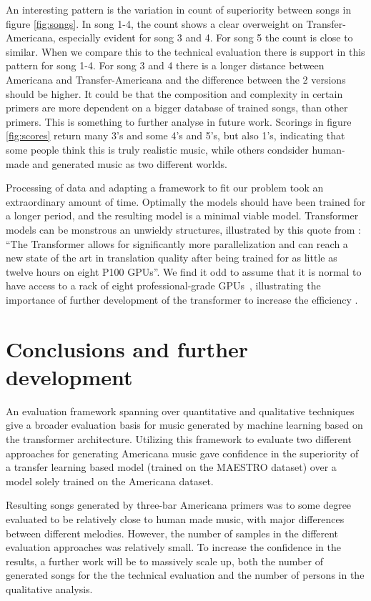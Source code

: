 \documentclass{IEEEtran}
\begin{document}
An interesting pattern is the variation in count of superiority between songs
in figure \ref{fig:songs}. In song 1-4, the count shows a clear overweight on
Transfer-Americana, especially evident for song 3 and 4. For song 5 the count
is close to similar. When we compare this to the technical evaluation there is 
support in this pattern for song 1-4. For song 3 and 4 there is a longer distance 
between Americana and Transfer-Americana and the difference between the 2 versions 
should be higher. It could be that the composition and complexity in
certain primers are more dependent on a bigger database of trained songs, than
other primers. This is something to further analyse in future work. Scorings
in figure \ref{fig:scores} return many 3's and some 4's and 5's, but also
1's, indicating that some people think this is truly realistic music, while
others condsider human-made and generated music as two different worlds.

Processing of data and adapting a framework to fit our problem 
took an extraordinary amount of time. Optimally the models should have been
trained for a longer period, and the resulting model is a minimal viable model.
Transformer models can be monstrous 
an unwieldy structures, illustrated by this quote from
\citeauthor{vaswani2017attention}: ``The Transformer allows for significantly
more parallelization and can reach a new state of the art in translation
quality after being trained for as little as twelve hours on eight P100 GPUs''.
We find it odd to assume that it is normal to have access to a rack of eight 
professional-grade GPUs~\cite{vaswani2017attention}, illustrating the importance
of further development of the transformer to increase the efficiency 
\cite{kitaev2020reformer}.

\section{Conclusions and further development}

An evaluation framework spanning over quantitative and qualitative techniques
give a broader evaluation basis for music generated by machine learning 
based on the transformer architecture. Utilizing this framework to evaluate two different 
approaches for generating Americana music gave confidence in the superiority of a 
transfer learning based model (trained on the MAESTRO dataset) over a model solely
trained on the Americana dataset.

Resulting songs generated by three-bar Americana primers was to some degree evaluated to 
be relatively close to human made music, with major differences between different melodies.
However, the number of samples in the different evaluation approaches was relatively small. 
To increase the confidence in the results, a further work will be to massively scale up, both the 
number of generated songs for the the technical evaluation and the number of persons in the 
qualitative analysis.
\end{document}
